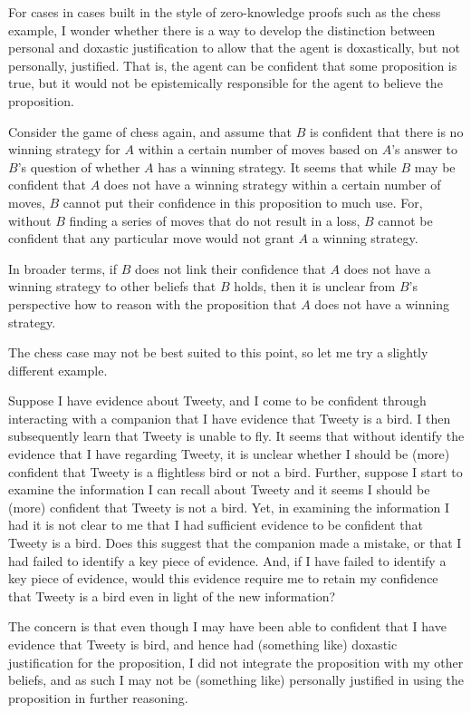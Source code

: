 \documentclass[10pt]{article}
\begin{document}
For cases in cases built in the style of zero-knowledge proofs such as the chess example, I wonder whether there is a way to develop the distinction between personal and doxastic justification to allow that the agent is doxastically, but not personally, justified.
That is, the agent can be confident that some proposition is true, but it would not be epistemically responsible for the agent to believe the proposition.

Consider the game of chess again, and assume that \(B\) is confident that there is no winning strategy for \(A\) within a certain number of moves based on \(A\)'s answer to \(B\)'s question of whether \(A\) has a winning strategy.
It seems that while \(B\) may be confident that \(A\) does not have a winning strategy within a certain number of moves, \(B\) cannot put their confidence in this proposition to much use.
For, without \(B\) finding a series of moves that do not result in a loss, \(B\) cannot be confident that any particular move would not grant \(A\) a winning strategy.

In broader terms, if \(B\) does not link their confidence that \(A\) does not have a winning strategy to other beliefs that \(B\) holds, then it is unclear from \(B\)'s perspective how to reason with the proposition that \(A\) does not have a winning strategy.

The chess case may not be best suited to this point, so let me try a slightly different example.

Suppose I have evidence about Tweety, and I come to be confident through interacting with a companion that I have evidence that Tweety is a bird.
I then subsequently learn that Tweety is unable to fly.
It seems that without identify the evidence that I have regarding Tweety, it is unclear whether I should be (more) confident that Tweety is a flightless bird or not a bird.
Further, suppose I start to examine the information I can recall about Tweety and it seems I should be (more) confident that Tweety is not a bird.
Yet, in examining the information I had it is not clear to me that I had sufficient evidence to be confident that Tweety is a bird.
Does this suggest that the companion made a mistake, or that I had failed to identify a key piece of evidence.
And, if I have failed to identify a key piece of evidence, would this evidence require me to retain my confidence that Tweety is a bird even in light of the new information?

The concern is that even though I may have been able to confident that I have evidence that Tweety is bird, and hence had (something like) doxastic justification for the proposition, I did not integrate the proposition with my other beliefs, and as such I may not be (something like) personally justified in using the proposition in further reasoning.
\end{document}
